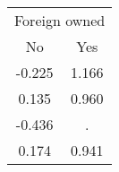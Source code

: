 \begin{tabular}{cc}
\toprule
\multicolumn{2}{c}{Foreign owned} \\
\cmidrule(lr){1-2}
No & Yes \\
\midrule
-0.225 & 1.166 \\
0.135 & 0.960 \\
-0.436 & . \\
0.174 & 0.941 \\
\bottomrule
\end{tabular}
